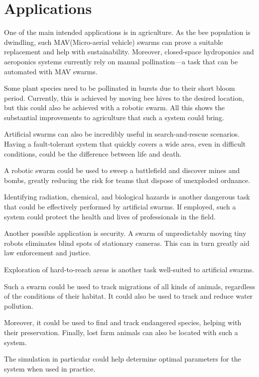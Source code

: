 \section{Applications}
\label{subsec:applications}
One of the main intended applications is in agriculture. As the bee population is dwindling, such MAV(Micro-aerial vehicle) swarms can prove a suitable replacement and help with sustainability. Moreover, closed-space hydroponics and aeroponics systems currently rely on manual pollination---a task that can be automated with MAV swarms. 
\par Some plant species need to be pollinated in bursts due to their short bloom period. Currently, this is achieved by moving bee hives to the desired location, but this could also be achieved with a robotic swarm. All this shows the substantial improvements to agriculture that such a system could bring.
\par Artificial swarms can also be incredibly useful in search-and-rescue scenarios. Having a fault-tolerant system that quickly covers a wide area, even in difficult conditions, could be the difference between life and death.   
\par A robotic swarm could be used to sweep a battlefield and discover mines and bombs, greatly reducing the risk for teams that dispose of unexploded ordnance.
\par Identifying radiation, chemical, and biological hazards is another dangerous task that could be effectively performed by artificial swarms. If employed, such a system could protect the health and lives of professionals in the field. 
\par Another possible application is security. A swarm of unpredictably moving tiny robots eliminates blind spots of stationary cameras. This can in turn greatly aid law enforcement and justice. 
\par Exploration of hard-to-reach areas is another task well-suited to artificial swarms.
\par Such a swarm could be used to track migrations of all kinds of animals, regardless of the conditions of their habitat. It could also be used to track and reduce water pollution.
\par Moreover, it could be used to find and track endangered species, helping with their preservation. Finally, lost farm animals can also be located with such a system. 
\par The simulation in particular could help determine optimal parameters for the system when used in practice.  

